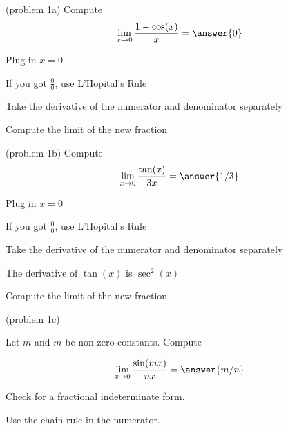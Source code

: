 \documentclass[handout]{ximera}
\begin{document}
\begin{problem}(problem 1a)
  Compute
  \[
  \lim_{x \to 0} \frac{1 - \cos(x)}{x} = \answer{0}
  \]
  
    \begin{hint}
      Plug in $x=0$
    \end{hint}
    \begin{hint}
      If you got $\frac00$, use L'Hopital's Rule
    \end{hint}
    \begin{hint}
      Take the derivative of the numerator and denominator separately
    \end{hint}
    \begin{hint}
      Compute the limit of the new fraction
    \end{hint}
    
		
	
\end{problem}



\begin{problem}(problem 1b)
  Compute
  \[
  \lim_{x \to 0} \frac{\tan(x)}{3x} = \answer{1/3}
  \]
  
    \begin{hint}
      Plug in $x=0$
    \end{hint}
    \begin{hint}
      If you got $\frac00$, use L'Hopital's Rule
    \end{hint}
    \begin{hint}
      Take the derivative of the numerator and denominator separately
    \end{hint}
		\begin{hint}
		  The derivative of $\tan(x)$ is $\sec^2(x)$
    \end{hint}
		\begin{hint}
      Compute the limit of the new fraction
    \end{hint}
	
\end{problem}





\begin{problem}(problem 1c)

Let $m$ and $m$ be non-zero constants. Compute

        \[  \lim_{x \to 0} \frac{\sin(mx)}{nx} = \answer{m/n} \]
  
   \begin{hint}   Check for a fractional indeterminate form.  \end{hint}
    
   \begin{hint}   Use the chain rule in the numerator.        \end{hint}
		
\end{problem}
\end{document}
